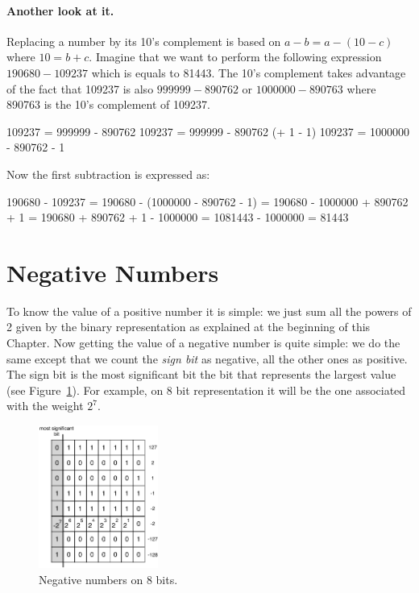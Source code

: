 \documentclass[a4paper,10pt,twoside]{book}
\begin{document}
\paragraph{Another look at it.} 
Replacing a number by its 10's complement is based on $a-b=a-(10-c)$ where $10=b+c$.
Imagine that we want to perform the following expression $190680-109237$ which is equals to 81443.
The 10's complement takes advantage of the fact that 109237 is also $999999-890762$ or $1000000-890763$ where 890763 is the 10's complement of 109237.

\begin{code}{}
109237 = 999999 - 890762
109237 = 999999 - 890762 (+ 1 - 1)
109237 = 1000000 - 890762 - 1
\end{code}

Now the first subtraction is expressed as:
\begin{code}{}
190680 - 109237
= 190680 - (1000000 - 890762 - 1)
= 190680 - 1000000 + 890762 + 1
= 190680  + 890762 + 1 - 1000000
= 1081443 - 1000000
= 81443
\end{code}




\section{Negative Numbers}
To know the value of a positive number it is simple: we just sum all the powers of 2 given by the binary representation as explained at the beginning of this Chapter. Now getting the value of a negative number is quite simple: we do the same except that we count the \emph{sign bit} as negative, all the other ones as positive. The sign bit is the most significant bit \ie the bit that represents the largest value (see Figure~\ref{negativeNumber}). For example, on 8 bit representation it will be the one associated with the weight $2^{7}$. 

\begin{figure}[h]
\begin{center}
\includegraphics[width=0.35\textwidth]{negativeNumber}
\caption{Negative numbers on 8 bits.\label{negativeNumber}}
\end{center}
\end{figure}
\end{document}
